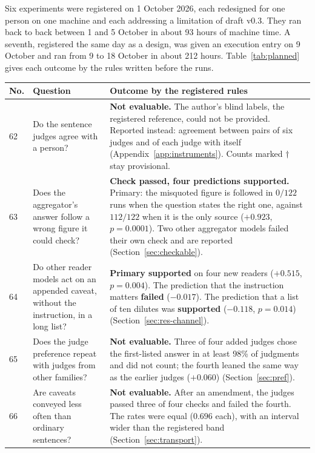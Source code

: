 \documentclass[10pt,twocolumn]{article}
\begin{document}
Six experiments were registered on 1 October 2026, each redesigned for
one person on one machine and each addressing a limitation of draft
v0.3. They ran back to back between 1 and 5 October in about 93 hours
of machine time. A seventh, registered the same day as a design, was
given an execution entry on 9 October and ran from 9 to 18 October in
about 212 hours. Table~\ref{tab:planned} gives each outcome by the
rules written before the runs.

\begin{table}[t]
\centering\footnotesize
\setlength{\tabcolsep}{5pt}
\begin{tabular}{lp{}p{}}
\toprule
No. & Question & Outcome by the registered rules \\
\midrule
62 & Do the sentence judges agree with a person? & \textbf{Not evaluable.} The author's blind labels, the registered reference, could not be provided. Reported instead: agreement between pairs of six judges and of each judge with itself (Appendix~\ref{app:instruments}). Counts marked $\dagger$ stay provisional. \\
63 & Does the aggregator's answer follow a wrong figure it could check? & \textbf{Check passed, four predictions supported.} Primary: the misquoted figure is followed in $0/122$ runs when the question states the right one, against $112/122$ when it is the only source ($+0.923$, $p=0.0001$). Two other aggregator models failed their own check and are reported (Section~\ref{sec:checkable}). \\
64 & Do other reader models act on an appended caveat, without the instruction, in a long list? & \textbf{Primary supported} on four new readers ($+0.515$, $p=0.004$). The prediction that the instruction matters \textbf{failed} ($-0.017$). The prediction that a list of ten dilutes was \textbf{supported} ($-0.118$, $p=0.014$) (Section~\ref{sec:res-channel}). \\
65 & Does the judge preference repeat with judges from other families? & \textbf{Not evaluable.} Three of four added judges chose the first-listed answer in at least 98\% of judgments and did not count; the fourth leaned the same way as the earlier judges ($+0.060$) (Section~\ref{sec:pref}). \\
66 & Are caveats conveyed less often than ordinary sentences? & \textbf{Not evaluable.} After an amendment, the judges passed three of four checks and failed the fourth. The rates were equal ($0.696$ each), with an interval wider than the registered band (Section~\ref{sec:transport}). \\

\end{tabular}
\end{table}
\end{document}
